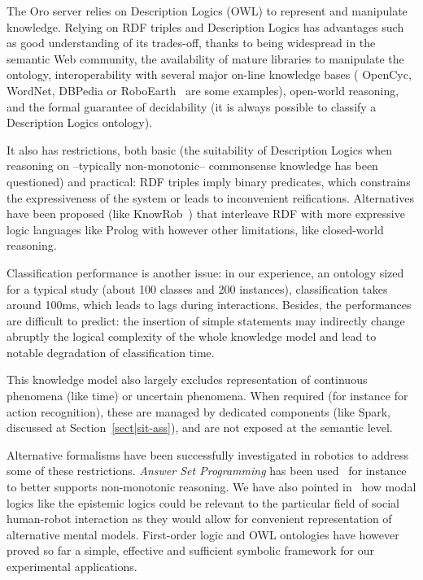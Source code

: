 \documentclass[preprint,3p,times]{elsarticle}
\begin{document}
The {\sc Oro} server relies on Description Logics (OWL) to represent and
manipulate knowledge. Relying on RDF triples and Description Logics has advantages such as good
understanding of its trades-off, thanks to being widespread in the semantic Web
community, the availability of mature libraries to manipulate the ontology,
interoperability with several major on-line knowledge bases ({\sc
OpenCyc}, {\sc WordNet}, {\sc DBPedia} or {\sc RoboEarth}~\cite{Waibel2011} are
some examples), open-world reasoning, and the formal guarantee of decidability
(it is always possible to classify a Description Logics ontology).

It also has restrictions, both basic (the suitability of
Description Logics when reasoning on --typically non-monotonic-- commonsense
knowledge has been questioned) and practical: RDF triples imply binary
predicates, which constrains the expressiveness of the system or leads to
inconvenient reifications. Alternatives have been proposed (like {\sc
KnowRob}~\cite{Tenorth2009a}) that interleave RDF with more expressive logic languages
like {\sc Prolog} with however other limitations, like closed-world reasoning.

Classification performance is another issue: in our experience, an
ontology sized for a typical study (about 100 classes and 200 instances),
classification takes around 100ms, which leads to lags during
interactions.  Besides, the performances are difficult to predict: the insertion
of simple statements may indirectly change abruptly the logical
complexity of the whole knowledge model and lead to notable degradation of
classification time.

This knowledge model also largely excludes representation of continuous
phenomena (like time) or uncertain phenomena. When required (for instance for
action recognition), these are managed by dedicated components (like {\sc
Spark}, discussed at Section~\ref{sect|sit-ass}), and are not exposed at
the semantic level.

Alternative formalisms have been successfully investigated in robotics to
address some of these restrictions. \emph{Answer Set Programming} has been
used~\cite{Chen2010,Erdem2012} for instance to better supports non-monotonic
reasoning. We have also pointed in~\cite{lemaignan2015mutual} how modal logics like
the epistemic logics could be relevant to the particular field of social
human-robot interaction as they would allow for convenient representation of
alternative mental models. First-order logic and OWL ontologies have however
proved so far a simple, effective and sufficient symbolic framework for our
experimental applications. 
\end{document}
